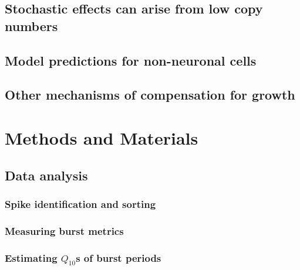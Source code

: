 \documentclass[9pt,lineno]{elife}
\begin{document}
\subsection{Stochastic effects can arise from low copy numbers}

\lipsum[3]

\subsection{Model predictions for non-neuronal cells}

\lipsum[2]

\subsection{Other mechanisms of compensation for growth}

\lipsum[5-6]




\section{Methods and Materials}

\subsection*{Data analysis}

\subsubsection*{Spike identification and sorting}

\subsubsection*{Measuring burst metrics}

\subsubsection*{Estimating $Q_{10}$s of burst periods}




\appendix
\end{document}
